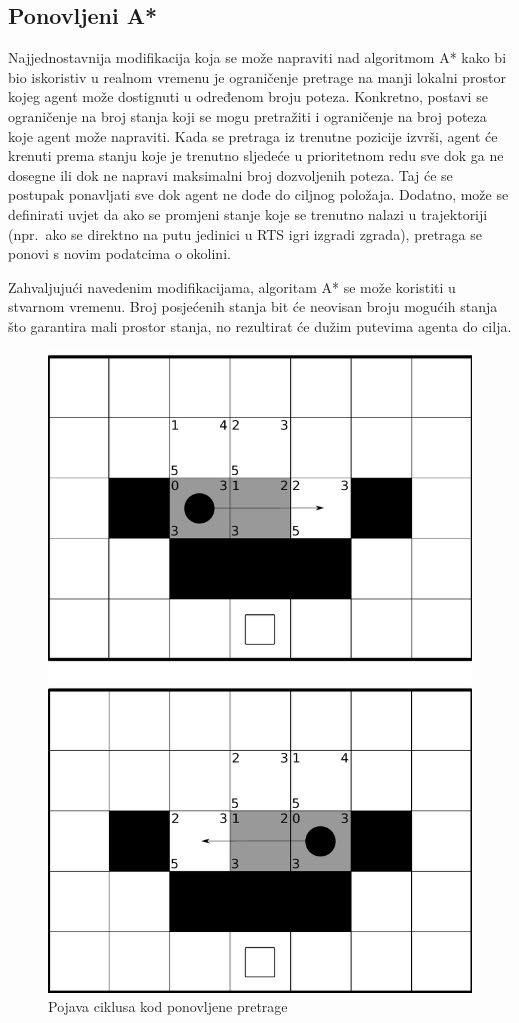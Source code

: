 \documentclass[times, utf8, zavrsni, numeric]{fer}
\begin{document}
\subsection{Ponovljeni A*}

\par Najjednostavnija modifikacija koja se može napraviti nad algoritmom A* kako bi bio iskoristiv u realnom vremenu je ograničenje pretrage na manji lokalni prostor kojeg agent može dostignuti u određenom broju poteza. 
Konkretno, postavi se ograničenje na broj stanja koji se mogu pretražiti i ograničenje na broj poteza koje agent može napraviti.
Kada se pretraga iz trenutne pozicije izvrši, agent će krenuti prema stanju koje je trenutno sljedeće u prioritetnom redu sve dok ga ne dosegne ili dok ne napravi maksimalni broj dozvoljenih poteza.
Taj će se postupak ponavljati sve dok agent ne dođe do ciljnog položaja.
Dodatno, može se definirati uvjet da ako se promjeni stanje koje se trenutno nalazi u trajektoriji (npr.\ ako se direktno na putu jedinici u RTS igri izgradi zgrada), pretraga se ponovi s novim podatcima o okolini.

\par Zahvaljujući navedenim modifikacijama, algoritam A* se može koristiti u stvarnom vremenu. 
Broj posjećenih stanja bit će neovisan broju mogućih stanja što garantira mali prostor stanja, no rezultirat će dužim putevima agenta do cilja.

\begin{figure}[h]
	\centering
	\includegraphics[width=0.45\linewidth]{images/repeatedAStarCycle.pdf}
	\caption{Pojava ciklusa kod ponovljene pretrage}
	\label{fig:pathfindingCycle}
\end{figure} 
\end{document}

